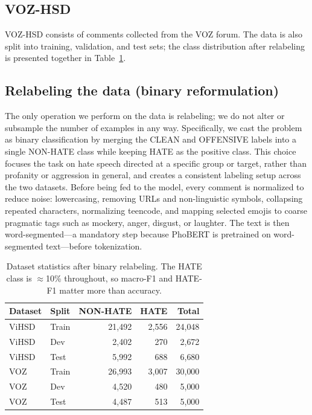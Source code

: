 \documentclass[11pt]{article}
\begin{document}
\subsection{VOZ-HSD}

VOZ-HSD \citep{vozhsd} consists of comments collected from the VOZ forum. The data is also split into training, validation, and test sets; the class distribution after relabeling is presented together in Table~\ref{tab:data}.

\subsection{Relabeling the data (binary reformulation)}
\label{sec:reshape}

The only operation we perform on the data is relabeling; we do not alter or subsample the number of examples in any way. Specifically, we cast the problem as binary classification by merging the CLEAN and OFFENSIVE labels into a single NON-HATE class while keeping HATE as the positive class. This choice focuses the task on hate speech directed at a specific group or target, rather than profanity or aggression in general, and creates a consistent labeling setup across the two datasets. Before being fed to the model, every comment is normalized to reduce noise: lowercasing, removing URLs and non-linguistic symbols, collapsing repeated characters, normalizing teencode, and mapping selected emojis to coarse pragmatic tags such as mockery, anger, disgust, or laughter. The text is then word-segmented---a mandatory step because PhoBERT is pretrained on word-segmented text---before tokenization.

\begin{table}[t]
  \centering
  \small
  \begin{tabular}{llrrr}
    \toprule
    \textbf{Dataset} & \textbf{Split} & \textbf{NON-HATE} & \textbf{HATE} & \textbf{Total} \\
    \midrule
    ViHSD & Train & 21{,}492 & 2{,}556 & 24{,}048 \\
    ViHSD & Dev   & 2{,}402  & 270     & 2{,}672  \\
    ViHSD & Test  & 5{,}992  & 688     & 6{,}680  \\
    VOZ   & Train & 26{,}993 & 3{,}007 & 30{,}000 \\
    VOZ   & Dev   & 4{,}520  & 480     & 5{,}000  \\
    VOZ   & Test  & 4{,}487  & 513     & 5{,}000  \\
    \bottomrule
  \end{tabular}
  \caption{Dataset statistics after binary relabeling. The HATE class is $\approx$10\% throughout, so macro-F1 and HATE-F1 matter more than accuracy.}
  \label{tab:data}
\end{table}
\end{document}
